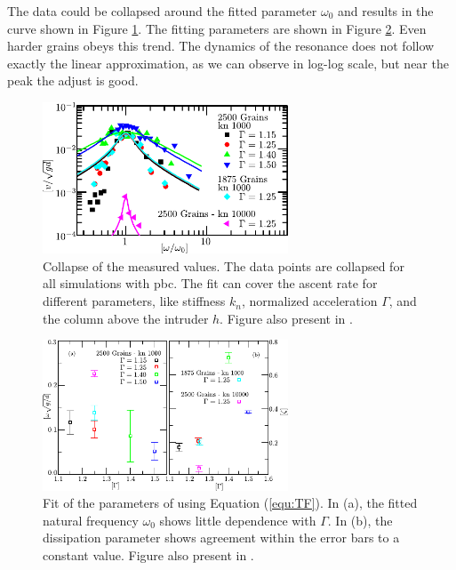     The data could be collapsed around the fitted parameter $\omega_0$ and results in the curve shown in Figure \ref{fig:BNE_collapse}. The fitting parameters are shown in Figure \ref{fig:BNE_fit_parameters}. Even harder grains obeys this trend. The dynamics of the resonance does not follow exactly the linear approximation, as we can observe in log-log scale, but near the peak the adjust is good.

\begin{figure}[H]
    \centering
    \includegraphics[width=0.65\textwidth]{04-figuras/BNE_Collapse.pdf}
    \caption[BNE with periodic boundary: resonance collapse.]{Collapse of the measured values. The data points are collapsed for all simulations with pbc. The fit can cover the ascent rate for different parameters, like stiffness $k_n$, normalized acceleration $\Gamma$, and the column above the intruder $h$. Figure also present in \cite{Large-deviation_quantification_of_boundary_conditions_on_the_Brazil_nut_effect}.}
    \label{fig:BNE_collapse}
\end{figure}

\begin{figure}[H]
    \centering
    \includegraphics[width=0.65\textwidth]{04-figuras/BNE_Fit.pdf}
    \caption[BNE with periodic boundary: resonance fitting parameters.]{Fit of the parameters of using Equation (\ref{equ:TF}). In (a), the fitted natural frequency $\omega_0$ shows little dependence with $\Gamma$. In (b), the dissipation parameter shows agreement within the error bars to a constant value. Figure also present in \cite{Large-deviation_quantification_of_boundary_conditions_on_the_Brazil_nut_effect}.}
    \label{fig:BNE_fit_parameters}
\end{figure}

